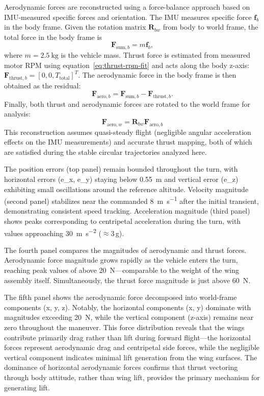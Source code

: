 Aerodynamic forces are reconstructed using a force-balance approach based on IMU-measured specific forces and orientation.
The IMU measures specific force $\mathbf{f}_b$ in the body frame.
Given the rotation matrix $\mathbf{R}_{bw}$ from body to world frame, the total force in the body frame is
\begin{equation}
\mathbf{F}_{\text{sum},b} = m \mathbf{f}_b,
\label{eq:force_balance_imu}
\end{equation}
where $m = \SI{2.5}{\kilogram}$ is the vehicle mass.
Thrust force is estimated from measured motor RPM using equation~\eqref{eq:thrust-rpm-fit} and acts along the body z-axis: $\mathbf{F}_{\text{thrust},b} = [0, 0, T_{\text{total}}]^T$.
The aerodynamic force in the body frame is then obtained as the residual:
\begin{equation}
\mathbf{F}_{\text{aero},b} = \mathbf{F}_{\text{sum},b} - \mathbf{F}_{\text{thrust},b}.
\label{eq:aero_force_extraction}
\end{equation}
Finally, both thrust and aerodynamic forces are rotated to the world frame for analysis:
\begin{equation}
\mathbf{F}_{\text{aero},w} = \mathbf{R}_{bw} \mathbf{F}_{\text{aero},b}
\end{equation}
This reconstruction assumes quasi-steady flight (negligible angular acceleration effects on the IMU measurements) and accurate thrust mapping, both of which are satisfied during the stable circular trajectories analyzed here.

The position errors (top panel) remain bounded throughout the turn, with horizontal errors (e\_x, e\_y) staying below \SI{0.55}{\meter} and vertical error (e\_z) exhibiting small oscillations around the reference altitude.
Velocity magnitude (second panel) stabilizes near the commanded \SI{8}{\meter\per\second} after the initial transient, demonstrating consistent speed tracking.
Acceleration magnitude (third panel) shows peaks corresponding to centripetal acceleration during the turn, with values approaching \SI{30}{\meter\per\second\squared} ($\approx$3\,g).

The fourth panel compares the magnitudes of aerodynamic and thrust forces.
Aerodynamic force magnitude grows rapidly as the vehicle enters the turn, reaching peak values of above \SI{20}{\newton}---comparable to the weight of the wing assembly itself.
Simultaneously, the thrust force magnitude is just above \SI{60}{\newton}.

The fifth panel shows the aerodynamic force decomposed into world-frame components (x, y, z).
Notably, the horizontal components (x, y) dominate with magnitudes exceeding \SI{20}{\newton}, while the vertical component (z-axis) remains near zero throughout the maneuver.
This force distribution reveals that the wings contribute primarily drag rather than lift during forward flight---the horizontal forces represent aerodynamic drag and centripetal side forces, while the negligible vertical component indicates minimal lift generation from the wing surfaces.
The dominance of horizontal aerodynamic forces confirms that thrust vectoring through body attitude, rather than wing lift, provides the primary mechanism for generating lift.

